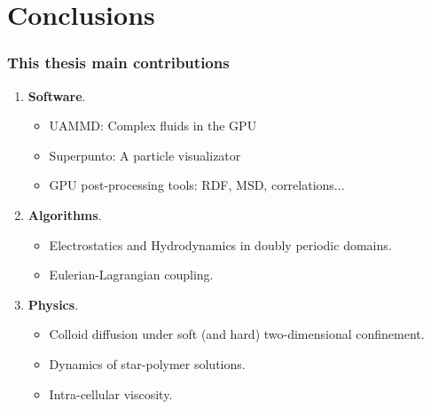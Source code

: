 \documentclass[xcolor=dvipsnames]{beamer}
\begin{document}
\section{Conclusions}
\begin{frame}
  \frametitle{This thesis main contributions}
  \begin{enumerate}
    \Large\color{blue}
  \item \textbf{Software}.
    \begin{itemize}
    \item<+-> UAMMD: Complex fluids in the GPU      
    \item<+-> Superpunto: A particle visualizator
    \item<+-> GPU post-processing tools: RDF, MSD, correlations...
    \end{itemize}
  \item<+-> \textbf{Algorithms}.
    \begin{itemize}
    \item<+-> Electrostatics and Hydrodynamics in doubly periodic domains.
    \item<+-> Eulerian-Lagrangian coupling.
    \end{itemize}
  \item<+-> \textbf{Physics}.
    \begin{itemize}
    \item<+-> Colloid diffusion under soft (and hard) two-dimensional confinement.
    \item<+-> Dynamics of star-polymer solutions.
    \item<+-> Intra-cellular viscosity.
    \end{itemize}
  \end{enumerate}
\end{frame}
\end{document}
